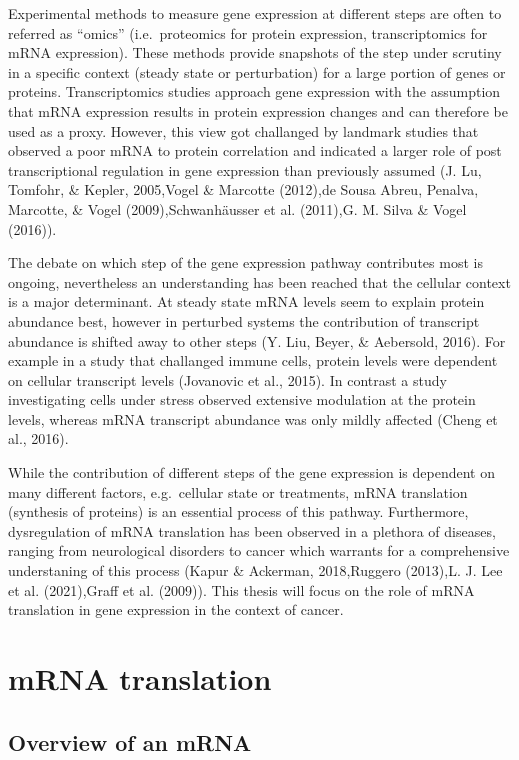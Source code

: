 \documentclass[12pt,openany]{book}
\begin{document}
Experimental methods to measure gene expression at different steps are
often to referred as ``omics'' (i.e.~proteomics for protein expression,
transcriptomics for mRNA expression). These methods provide snapshots of
the step under scrutiny in a specific context (steady state or
perturbation) for a large portion of genes or proteins. Transcriptomics
studies approach gene expression with the assumption that mRNA
expression results in protein expression changes and can therefore be
used as a proxy. However, this view got challanged by landmark studies
that observed a poor mRNA to protein correlation and indicated a larger
role of post transcriptional regulation in gene expression than
previously assumed (J. Lu, Tomfohr, \& Kepler, 2005,Vogel \& Marcotte
(2012),de Sousa Abreu, Penalva, Marcotte, \& Vogel (2009),Schwanhäusser
et al. (2011),G. M. Silva \& Vogel (2016)).

The debate on which step of the gene expression pathway contributes most
is ongoing, nevertheless an understanding has been reached that the
cellular context is a major determinant. At steady state mRNA levels
seem to explain protein abundance best, however in perturbed systems the
contribution of transcript abundance is shifted away to other steps (Y.
Liu, Beyer, \& Aebersold, 2016). For example in a study that challanged
immune cells, protein levels were dependent on cellular transcript
levels (Jovanovic et al., 2015). In contrast a study investigating cells
under stress observed extensive modulation at the protein levels,
whereas mRNA transcript abundance was only mildly affected (Cheng et
al., 2016).

While the contribution of different steps of the gene expression is
dependent on many different factors, e.g.~cellular state or treatments,
mRNA translation (synthesis of proteins) is an essential process of this
pathway. Furthermore, dysregulation of mRNA translation has been
observed in a plethora of diseases, ranging from neurological disorders
to cancer which warrants for a comprehensive understaning of this
process (Kapur \& Ackerman, 2018,Ruggero (2013),L. J. Lee et al.
(2021),Graff et al. (2009)). This thesis will focus on the role of mRNA
translation in gene expression in the context of cancer. \clearpage

\section{mRNA translation}\subsection{Overview of an mRNA}
\end{document}

